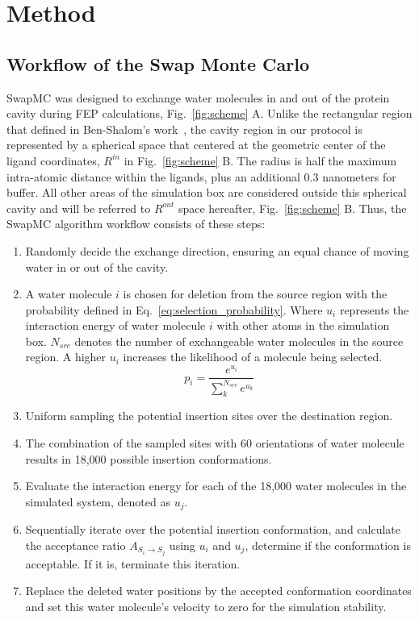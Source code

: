 \documentclass[journal=jacsat,manuscript=article]{achemso}
\begin{document}
\section{Method}
\subsection{Workflow of the Swap Monte Carlo}
SwapMC was designed to exchange water molecules in and out of the protein cavity during FEP calculations, Fig.~\ref{fig:scheme} A.
Unlike the rectangular region that defined in Ben-Shalom's work~\cite{ben2021fast}, 
the cavity region in our protocol is represented by a spherical space that centered at the geometric center of the ligand coordinates, $R^{in}$ in Fig.~\ref{fig:scheme} B.
The radius is half the maximum intra-atomic distance within the ligands, plus an additional 0.3 nanometers for buffer.
All other areas of the simulation box are considered outside this spherical cavity and will be referred to $R^{out}$ space hereafter, Fig.~\ref{fig:scheme} B.
Thus, the SwapMC algorithm workflow consists of these steps:
\begin{enumerate}
  \item Randomly decide the exchange direction, ensuring an equal chance of moving water in or out of the cavity.
  \item A water molecule $i$ is chosen for deletion from the source region with the probability defined in Eq.~\ref{eq:selection_probability}. Where $u_i$ represents the interaction energy of water molecule $i$ with other atoms in the simulation box. $N_{src}$ denotes the number of exchangeable water molecules in the source region. A higher $u_i$ increases the likelihood of a molecule being selected. 
  \begin{equation}\label{eq:selection_probability}
    p_i = \frac{e^{u_i}}{\sum^{N_{src}}_k{e^{u_k}}}    
  \end{equation}
  \item Uniform sampling the potential insertion sites over the destination region.
  \item The combination of the sampled sites with 60 orientations of water molecule results in 18,000 possible insertion conformations.
  \item Evaluate the interaction energy for each of the 18,000 water molecules in the simulated system, denoted as $u_j$.
  \item Sequentially iterate over the potential insertion conformation, and calculate the acceptance ratio $A_{S_i \to S_j}$ using $u_i$ and $u_j$, determine if the conformation is acceptable. 
  If it is, terminate this iteration.
  \item Replace the deleted water positions by the accepted conformation coordinates and set this water molecule's velocity to zero for the simulation stability.
\end{enumerate}
\end{document}
